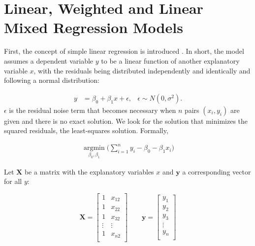 \documentclass[11pt,a4paper,twoside]{book}\usepackage[]{graphicx}\usepackage[]{color}
\begin{document}

\section{Linear, Weighted and Linear Mixed Regression Models} \label{sec:regression}
First, the concept of simple linear regression is introduced \citep{fahrmeir2007}. In short, the model assumes a dependent variable $y$ to be a linear function of another explanatory variable $x$, with the residuals being distributed independently and identically and following a normal distribution:

\begin{align}
y &= \beta_0 + \beta_1 x + \epsilon, & \epsilon \sim N(0, \sigma^2). \label{eq:simple.regression}
\end{align}
$\epsilon$ is the residual noise term that becomes necessary when $n$ pairs $(x_i, y_i)$ are given and there is no exact solution. We look for the solution that minimizes the squared residuals, the least-squares solution. Formally,

\begin{align}
\operatorname*{argmin}_{\beta_0, \beta_1}\Big(\sum_{i = 1}^n y_i - \beta_0 - \beta_1 x_i\Big) \label{eq:least.squares}
\end{align}

Let $\mathbf{X}$ be a matrix with the explanatory variables $x$ and $\mathbf{y}$ a corresponding vector for all $y$:

\begin{equation*}
\mathbf{X} = 
\begin{bmatrix}
1 & x_{12} \\
1 & x_{22} \\
1 & x_{32} \\
\vdots & \vdots \\
1 & x_{n2} \\
\end{bmatrix} 
\qquad
\mathbf{y} = 
\begin{bmatrix}
y_1 \\
y_2 \\
y_3 \\
\vdots \\
y_n \\
\end{bmatrix}
\end{equation*}
\end{document}
